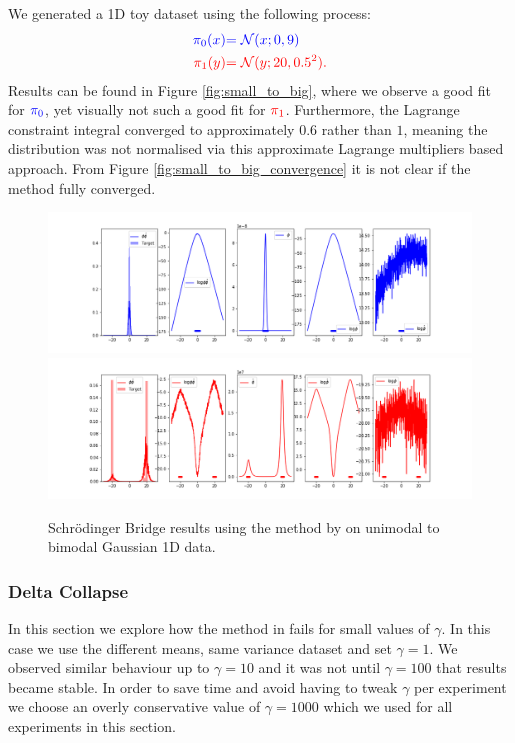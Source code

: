 \documentclass[a4paper,12pt,twoside,openright]{report}
\theoremstyle{definition}
\begin{document}
We generated a 1D toy dataset using the following process:
\begin{align*}
     \color{blue}{\pi_0(x)} &\color{blue}{= {\mathcal{N}}(x; 0,  9)} \\
    \color{red}{\pi_1(y)} &\color{red}{= {\mathcal{N}}(y; 20, 0.5 ^2)}. 
\end{align*}
Results can be found in Figure \ref{fig:small_to_big}, where we observe a good fit for $\color{blue}{\pi_0}$, yet visually not such a good fit for $\color{red}{\pi_1}$. Furthermore, the Lagrange constraint integral converged to approximately $0.6$ rather than $1$, meaning the distribution was not normalised via this approximate Lagrange multipliers based approach. From Figure \ref{fig:small_to_big_convergence} it is not clear if the method fully converged. 
\begin{figure}[t]
    \centering
     \includegraphics[scale=0.4,trim={2.3cm 0.2cm 1.5cm 0}, clip]{images/Pavon/Forward_bimodal_test_working.png} \\ \vspace{-0.2cm}
    \includegraphics[scale=0.4,trim={2.3cm 0 1.5cm 1.5cm}, clip]{images/Pavon/Backward_bimodal_test_working.png} 
    \caption{Schrödinger Bridge results using the method by \cite{pavon2018data} on unimodal to bimodal Gaussian 1D data. }
    \label{fig:pavon_bimodal}
\end{figure}
\subsubsection{Delta Collapse}
In this section we explore how the method in \cite{pavon2018data} fails for small values of $\gamma$. In this case we use the different means, same variance dataset and set $\gamma=1$. We observed similar behaviour up to $\gamma=10$ and it was not until $\gamma=100$ that results became stable. In order to save time and avoid having to tweak $\gamma$ per experiment we choose an overly conservative value of $\gamma=1000$ which we used for all experiments in this section.
\end{document}
